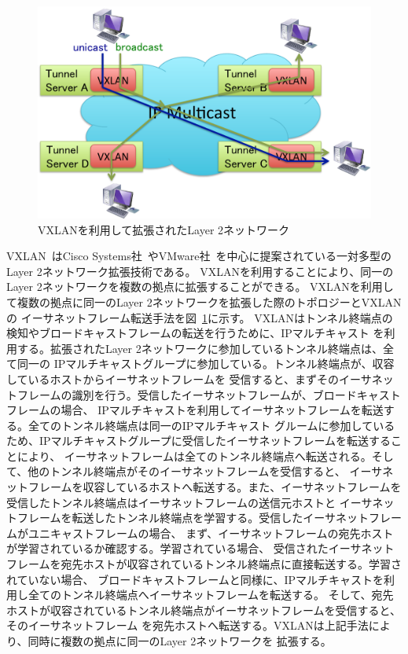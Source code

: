 \begin{figure}
	\begin{center}
		\includegraphics[scale=0.60]{./img/vxlantopology}
		\caption{VXLANを利用して拡張されたLayer 2ネットワーク}
		\label{img:vxlantopology}
	\end{center}
\end{figure}

VXLAN~\cite{id:vxlan}はCisco Systems社~\cite{cisco}やVMware社~\cite{vmware}を中心に提案されている一対多型のLayer 2ネットワーク拡張技術である。
VXLANを利用することにより、同一のLayer 2ネットワークを複数の拠点に拡張することができる。
VXLANを利用して複数の拠点に同一のLayer 2ネットワークを拡張した際のトポロジーとVXLANの
イーサネットフレーム転送手法を図~\ref{img:vxlantopology}に示す。
VXLANはトンネル終端点の検知やブロードキャストフレームの転送を行うために、IPマルチキャスト
を利用する。拡張されたLayer 2ネットワークに参加しているトンネル終端点は、全て同一の
IPマルチキャストグループに参加している。トンネル終端点が、収容しているホストからイーサネットフレームを
受信すると、まずそのイーサネットフレームの識別を行う。受信したイーサネットフレームが、ブロードキャストフレームの場合、
IPマルチキャストを利用してイーサネットフレームを転送する。全てのトンネル終端点は同一のIPマルチキャスト
グルームに参加しているため、IPマルチキャストグループに受信したイーサネットフレームを転送することにより、
イーサネットフレームは全てのトンネル終端点へ転送される。そして、他のトンネル終端点がそのイーサネットフレームを受信すると、
イーサネットフレームを収容しているホストへ転送する。また、イーサネットフレームを受信したトンネル終端点はイーサネットフレームの送信元ホストと
イーサネットフレームを転送したトンネル終端点を学習する。受信したイーサネットフレームがユニキャストフレームの場合、
まず、イーサネットフレームの宛先ホストが学習されているか確認する。学習されている場合、
受信されたイーサネットフレームを宛先ホストが収容されているトンネル終端点に直接転送する。学習されていない場合、
ブロードキャストフレームと同様に、IPマルチキャストを利用し全てのトンネル終端点へイーサネットフレームを転送する。
そして、宛先ホストが収容されているトンネル終端点がイーサネットフレームを受信すると、そのイーサネットフレーム
を宛先ホストへ転送する。VXLANは上記手法により、同時に複数の拠点に同一のLayer 2ネットワークを
拡張する。

